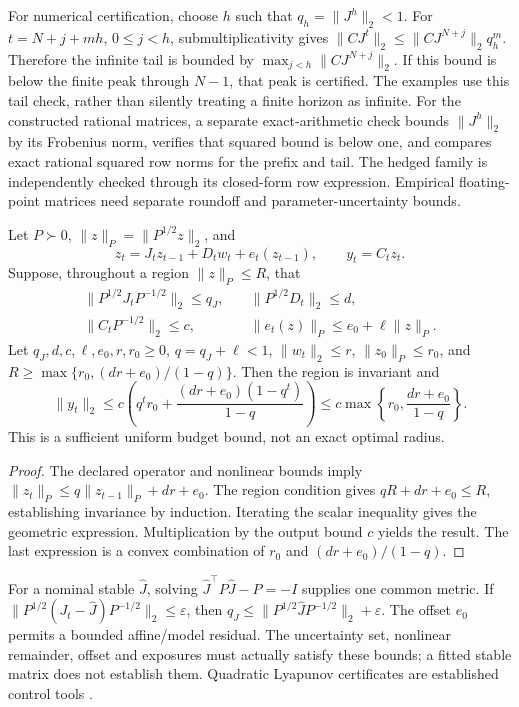 For numerical certification, choose $h$ such that $q_h=\|J^h\|_2<1$. For $t=N+j+mh$, $0\le j<h$, submultiplicativity gives $\|CJ^t\|_2\le\|CJ^{N+j}\|_2q_h^m$. Therefore the infinite tail is bounded by $\max_{j<h}\|CJ^{N+j}\|_2$. If this bound is below the finite peak through $N-1$, that peak is certified. The examples use this tail check, rather than silently treating a finite horizon as infinite. For the constructed rational matrices, a separate exact-arithmetic check bounds $\|J^h\|_2$ by its Frobenius norm, verifies that squared bound is below one, and compares exact rational squared row norms for the prefix and tail. The hedged family is independently checked through its closed-form row expression. Empirical floating-point matrices need separate roundoff and parameter-uncertainty bounds.

\begin{proposition}
\label{prop:robust_metric_loss}
Let $P\succ0$, $\|z\|_P=\|P^{1/2}z\|_2$, and
\[
z_t=J_tz_{t-1}+D_tw_t+e_t(z_{t-1}),\qquad y_t=C_tz_t.
\]
Suppose, throughout a region $\|z\|_P\le R$, that
\[
\begin{aligned}
\|P^{1/2}J_tP^{-1/2}\|_2\le q_J,&\quad \|P^{1/2}D_t\|_2\le d,\\
\|C_tP^{-1/2}\|_2\le c,&\quad \|e_t(z)\|_P\le e_0+\ell\|z\|_P.
\end{aligned}
\]
Let $q_J,d,c,\ell,e_0,r,r_0\ge0$, $q=q_J+\ell<1$, $\|w_t\|_2\le r$, $\|z_0\|_P\le r_0$, and $R\ge\max\{r_0,(dr+e_0)/(1-q)\}$. Then the region is invariant and
\[
\|y_t\|_2\le c\left(q^t r_0+\frac{(dr+e_0)(1-q^t)}{1-q}\right)
\le c\max\left\{r_0,\frac{dr+e_0}{1-q}\right\}.
\]
This is a sufficient uniform budget bound, not an exact optimal radius.
\end{proposition}
\begin{proof}
The declared operator and nonlinear bounds imply $\|z_t\|_P\le q\|z_{t-1}\|_P+dr+e_0$. The region condition gives $qR+dr+e_0\le R$, establishing invariance by induction. Iterating the scalar inequality gives the geometric expression. Multiplication by the output bound $c$ yields the result. The last expression is a convex combination of $r_0$ and $(dr+e_0)/(1-q)$.
\end{proof}
For a nominal stable $\widehat J$, solving $\widehat J^\top P\widehat J-P=-I$ supplies one common metric. If
$\|P^{1/2}(J_t-\widehat J)P^{-1/2}\|_2\le\varepsilon$, then $q_J\le\|P^{1/2}\widehat JP^{-1/2}\|_2+\varepsilon$. The offset $e_0$ permits a bounded affine/model residual. The uncertainty set, nonlinear remainder, offset and exposures must actually satisfy these bounds; a fitted stable matrix does not establish them. Quadratic Lyapunov certificates are established control tools \citep{boyd1994lmi}.

